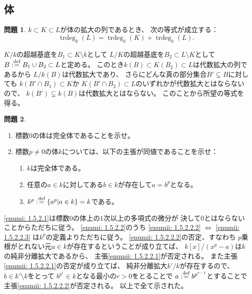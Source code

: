 \documentclass[uplatex]{jsarticle}
\makeatletter
\theoremstyle{definition}
\newtheorem{prob}[prob]{問題}
\renewenvironment{proof}[1][\proofname]{
  \pushQED{\qed}%
  \normalfont \topsep6\p@\@plus6\p@\relax
  \trivlist
  \item[\hskip\labelsep
    #1\@addpunct{\textbf{.}}]\ignorespaces
}{%
  \popQED\endtrivlist\@endpefalse
}
\providecommand{\proofname}{証明}
\DeclareMathOperator{\trdeg}{\mathrm{trdeg}}
\def\dfn{:\overset{\mbox{{\scriptsize def}}}{=}}
\makeatother
\begin{document}
\subsection{体}

\begin{prob}\label{prob: 1.5.1}
  \(k\subset K\subset L\)が体の拡大の列であるとき、
  次の等式が成立する：
  \[
  \trdeg_k(L) = \trdeg_k(K) + \trdeg_k(L).
  \]
\end{prob}

\begin{proof}
  \(K/k\)の超越基底を\(B_1\subset K\setminus k\)として
  \(L/K\)の超越基底を\(B_2\subset L\setminus K\)として
  \(B\dfn B_1\cup B_2\subset L\)と定める。
  このとき\(k(B)\subset K(B_2)\subset L\)は代数拡大の列であるから
  \(L/k(B)\)は代数拡大であり、
  さらにどんな真の部分集合\(B'\subsetneq B\)に対しても
  \(k(B'\cap B_1)\subset K\)か
  \(K(B'\cap B_2)\subset L\)のいずれかが代数拡大とはならないので、
  \(k(B')\subsetneq k(B)\)は代数拡大とはならない。
  このことから所望の等式を得る。
\end{proof}



\begin{prob}\label{prob: 1.5.2}
  \begin{enumerate}
    \item \label{enumi: 1.5.2.1}
    標数\(0\)の体は完全体であることを示せ。
    \item \label{enumi: 1.5.2.2}
    標数\(p\neq 0\)の体\(k\)については、以下の主張が同値であることを示せ：
    \begin{enumerate}
      \item \label{enumii: 1.5.2.2.1}
      \(k\)は完全体である。
      \item \label{enumii: 1.5.2.2.2}
      任意の\(a\in k\)に対してある\(b\in k\)が存在して\(a=b^p\)となる。
      \item \label{enumii: 1.5.2.2.3}
      \(k^p \dfn \{a^p| a\in k\} = k\)である。
    \end{enumerate}
  \end{enumerate}
\end{prob}

\begin{proof}
  \ref{enumi: 1.5.2.1}は標数\(0\)の体上の\(1\)次以上の多項式の微分が
  決して\(0\)とはならないことからただちに従う。
  \ref{enumi: 1.5.2.2}のうち \ref{enumii: 1.5.2.2.2} \(\Leftrightarrow\)
  \ref{enumii: 1.5.2.2.3} は\(k^p\)の定義よりただちに従う。
  \ref{enumii: 1.5.2.2.2}の否定、すなわち
  \(p\)乗根がとれない元\(a\in k\)が存在するということが成り立てば、
  \(k[x]/(x^p - a)\)は\(k\)の純非分離拡大であるから、
  主張\ref{enumii: 1.5.2.2.1}が否定される。
  また主張\ref{enumii: 1.5.2.2.1}の否定が成り立てば、
  純非分離拡大\(k'/k\)が存在するので、
  \(b\in k'\setminus k\)をとって
  \(b^{p^r} \in k\)となる最小の\(r > 0\)をとることで
  \(a\dfn b^{p^{r-1}}\)とすることで主張\ref{enumii: 1.5.2.2.2}が否定される。
  以上で全て示された。
\end{proof}
\end{document}
